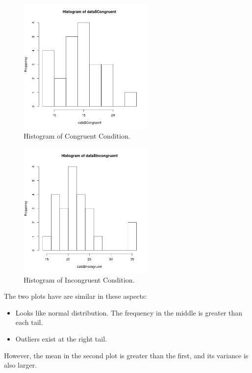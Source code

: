 \documentclass[paper=a4, fontsize=11pt]{scrartcl} %
\numberwithin{equation}{section} %
\numberwithin{figure}{section} %
\numberwithin{table}{section} %
\begin{document}
\clearpage
\begin{figure}[h!]
    \centering
    \includegraphics[width=0.6\textwidth]{hist_congruent.png}
    \caption{Histogram of Congruent Condition.}
    \label{fig:hist-congruent}
\end{figure}

\begin{figure}[h!]
    \centering
    \includegraphics[width=0.6\textwidth]{hist_incongruent.png}
    \caption{Histogram of Incongruent Condition.}
    \label{fig:hist-incongruent}
\end{figure}

The two plots have are similar in these aspects:
\begin{itemize}
    \item Looks like normal distribution. The frequency in the middle
        is greater than each tail.
    \item Outliers exist at the right tail.
\end{itemize}

However, the mean in the second plot is greater than the first, and
its variance is also larger.
\end{document}
